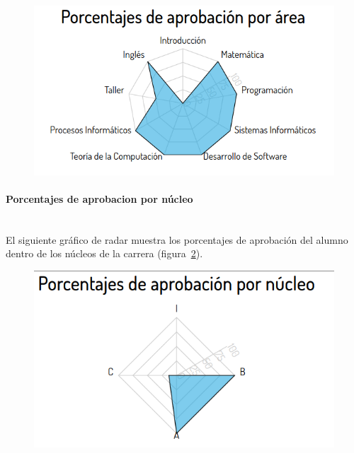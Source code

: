 \begin{figure}[H]
  \centering
    \includegraphics[scale=0.4]{images/seguimiento-academico/sa-porcentajesarea.png}
  \label{fig:sa-porcentaje-area}
\end{figure}

\paragraph{Porcentajes de aprobacion por núcleo} \mbox{}\\
El siguiente gráfico de radar muestra los porcentajes de aprobación del alumno dentro de los núcleos de la carrera (figura~\ref{fig:sa-porcentaje-nucleo}).

\begin{figure}[H]
  \centering
    \includegraphics[scale=0.4]{images/seguimiento-academico/sa-porcentajesnucleo.png}
  \label{fig:sa-porcentaje-nucleo}
\end{figure}

